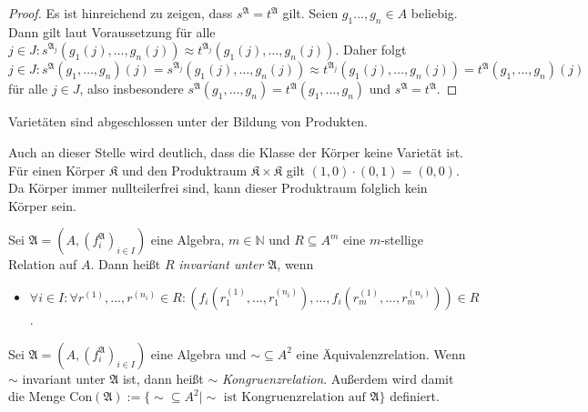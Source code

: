 \begin{proof}
    Es ist hinreichend zu zeigen, dass $s^\mathfrak{A}=t^\mathfrak{A}$ gilt. Seien $g_1\ldots,g_n\in A$ beliebig.
    Dann gilt laut Voraussetzung für alle $j\in J:s^{\mathfrak{A}_j}(g_1(j),\ldots,g_n(j))\approx t^{\mathfrak{A}_j}(g_1(j),\ldots,g_n(j))$.
    Daher folgt $j\in J:s^\mathfrak{A}(g_1,\ldots,g_n)(j)=s^{\mathfrak{A}_j}(g_1(j),\ldots,g_n(j))\approx t^{\mathfrak{A}_j}(g_1(j),\ldots,g_n(j))=t^\mathfrak{A}(g_1,\ldots,g_n)(j)$
    für alle $j\in J$, also insbesondere $s^\mathfrak{A}(g_1,\ldots,g_n)=t^\mathfrak{A}(g_1,\ldots,g_n)$ und $s^\mathfrak{A}=t^\mathfrak{A}.$
\end{proof}

\begin{corollary}
    Varietäten sind abgeschlossen unter der Bildung von Produkten.
\end{corollary}

\begin{remark}
    Auch an dieser Stelle wird deutlich, dass die Klasse der Körper keine Varietät ist. Für einen Körper $\mathfrak{K}$
    und den Produktraum $\mathfrak{K}\times \mathfrak{K}$ gilt $(1,0)\cdot (0,1)=(0,0)$. Da Körper immer nullteilerfrei sind,
    kann dieser Produktraum folglich kein Körper sein.
\end{remark}

\begin{definition}
    Sei $\mathfrak{A}=(A,(f^\mathfrak{A}_i)_{i\in I})$ eine Algebra, $m\in\mathbb{N}$ und $R\subseteq A^m$ eine $m$-stellige
    Relation auf $A$. Dann heißt $R$ \emph{invariant unter $\mathfrak{A}$}, wenn
    \begin{itemize}[topsep=0pt, label={--}]
        \item $\forall i\in I:\forall r^{(1)},\ldots,r^{(n_i)}\in R:(f_i(r_1^{(1)},\ldots,r_1^{(n_i)}),\ldots,f_i(r_m^{(1)},\ldots,r_m^{(n_i)}))\in R$.
    \end{itemize}
\end{definition}

\begin{definition}
    Sei $\mathfrak{A}=(A,(f^\mathfrak{A}_i)_{i\in I})$ eine Algebra und $\sim\subseteq A^2$ eine Äquivalenzrelation.
    Wenn $\sim$ invariant unter $\mathfrak{A}$ ist, dann heißt $\sim$ \emph{Kongruenzrelation}. Außerdem wird damit die Menge
    Con$(\mathfrak{A}):=\{\sim\subseteq A^2\mid \sim \text{ ist Kongruenzrelation auf }\mathfrak{A}\}$ definiert.
\end{definition}

